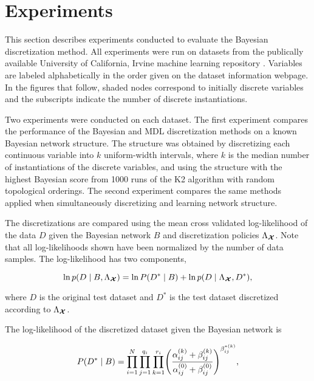 \section{Experiments}
\label{sec:experiments}

This section describes experiments conducted to evaluate the Bayesian discretization method.
All experiments were run on datasets from the publically available University of California, Irvine machine learning repository \citep{Lichman_2013}.
Variables are labeled alphabetically in the order given on the dataset information webpage.
In the figures that follow, shaded nodes correspond to initially discrete variables and the subscripts indicate the number of discrete instantiations.

Two experiments were conducted on each dataset.
The first experiment compares the performance of the Bayesian and MDL discretization methods on a known Bayesian network structure.
The structure was obtained by discretizing each continuous variable into $k$ uniform-width intervals, where $k$ is the median number of instantiations of the discrete variables, and using the structure with the highest Bayesian score from \num{1000} runs of the K2 algorithm with random topological orderings.
The second experiment compares the same methods applied when simultaneously discretizing and learning network structure.

The discretizations are compared using the mean cross validated log-likelihood of the data $D$ given the Bayesian network $B$ and discretization policies $\Lambda_{\bm{\mathcal{X}}}$.
Note that all log-likelihoods shown have been normalized by the number of data samples.
The log-likelihood has two components,

\begin{equation}
\ln p(D\mid B, \Lambda_{\bm{\mathcal{X}}}) = \ln P(D^*\mid B) + \ln p(D\mid \Lambda_{\bm{\mathcal{X}}}, D^*)\text{,}
\end{equation}

\noindent
where $D$ is the original test dataset and $D^*$ is the test dataset discretized according to $\Lambda_{\bm{\mathcal{X}}}$.

The log-likelihood of the discretized dataset given the Bayesian network is

\begin{equation}
P(D^* \mid B) = \prod_{i=1}^N \prod_{j=1}^{q_i} \prod_{k=1}^{r_i}
\paren{
  \frac{
    \alpha_{ij}^{(k)} + \beta_{ij}^{(k)}
  }{
    \alpha_{ij}^{(0)} + \beta_{ij}^{(0)}
    }
}^{\beta_{ij}^{*(k)}}\text{,}
\end{equation}

